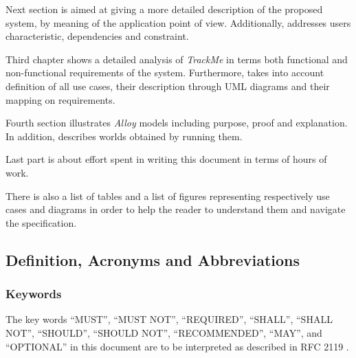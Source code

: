 \documentclass[a4paper]{article}
\begin{document}
        Next section is aimed at giving a more detailed description of the proposed system, by meaning of the application point of view. Additionally, addresses users characteristic, dependencies and constraint.
        
        Third chapter shows a detailed analysis of \textit{TrackMe} in terms both functional and non-functional requirements of the system. Furthermore, takes into account definition of all use cases, their description through UML diagrams and their mapping on requirements.
        
        Fourth section illustrates \textit{Alloy} models including purpose, proof and explanation. In addition, describes worlds obtained by running them.
        
        Last part is about effort spent in writing this document in terms of hours of work.
        
        There is also a list of tables and a list of figures representing respectively use cases and diagrams in order to help the reader to understand them and navigate the specification.
        
    \subsection{Definition, Acronyms and  Abbreviations}
            \subsubsection{Keywords}
            The key words “MUST”, “MUST NOT”, “REQUIRED”, “SHALL”, “SHALL NOT”, “SHOULD”, “SHOULD NOT”, “RECOMMENDED”, “MAY”, and “OPTIONAL” in this document are to be interpreted as described in RFC 2119 \cite{bradner1997key}.
\end{document}
